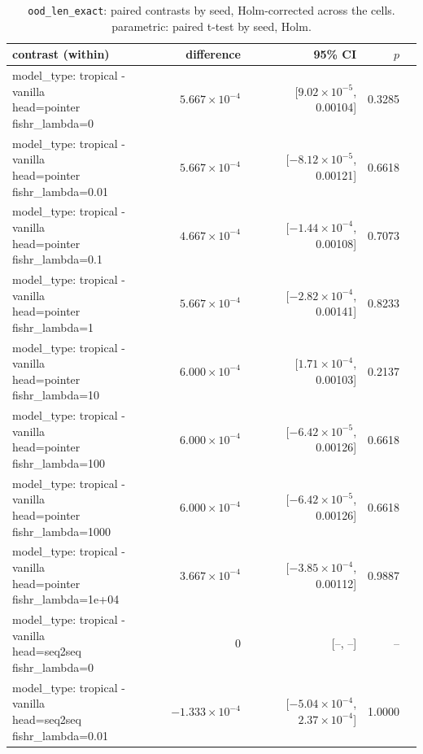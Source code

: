 \documentclass[10pt]{article}
\makeatletter
\newcommand{\stackcell}[1]{\begin{tabular}[t]{@{}l@{}}#1\end{tabular}}
\makeatother
\begin{document}
{\small
\begin{longtable}{lrrrl}
\caption{\texttt{ood\_len\_exact}: paired contrasts by seed, Holm-corrected across the cells. parametric: paired t-test by seed, Holm.}\label{tab:paired-ood_len_exact}\\
\toprule
contrast (within) & difference & 95\% CI & $p$ & \\
\midrule
\endhead
\stackcell{model\_type: tropical - vanilla\\\footnotesize head=pointer fishr\_lambda=0 } & $5.667\times10^{-4}$ & [$9.02\times10^{-5}$, 0.00104] & 0.3285 & \\
\stackcell{model\_type: tropical - vanilla\\\footnotesize head=pointer fishr\_lambda=0.01 } & $5.667\times10^{-4}$ & [$-8.12\times10^{-5}$, 0.00121] & 0.6618 & \\
\stackcell{model\_type: tropical - vanilla\\\footnotesize head=pointer fishr\_lambda=0.1 } & $4.667\times10^{-4}$ & [$-1.44\times10^{-4}$, 0.00108] & 0.7073 & \\
\stackcell{model\_type: tropical - vanilla\\\footnotesize head=pointer fishr\_lambda=1 } & $5.667\times10^{-4}$ & [$-2.82\times10^{-4}$, 0.00141] & 0.8233 & \\
\stackcell{model\_type: tropical - vanilla\\\footnotesize head=pointer fishr\_lambda=10 } & $6.000\times10^{-4}$ & [$1.71\times10^{-4}$, 0.00103] & 0.2137 & \\
\stackcell{model\_type: tropical - vanilla\\\footnotesize head=pointer fishr\_lambda=100 } & $6.000\times10^{-4}$ & [$-6.42\times10^{-5}$, 0.00126] & 0.6618 & \\
\stackcell{model\_type: tropical - vanilla\\\footnotesize head=pointer fishr\_lambda=1000 } & $6.000\times10^{-4}$ & [$-6.42\times10^{-5}$, 0.00126] & 0.6618 & \\
\stackcell{model\_type: tropical - vanilla\\\footnotesize head=pointer fishr\_lambda=1e+04 } & $3.667\times10^{-4}$ & [$-3.85\times10^{-4}$, 0.00112] & 0.9887 & \\
\stackcell{model\_type: tropical - vanilla\\\footnotesize head=seq2seq fishr\_lambda=0 } & 0 & [--, --] & -- & \\
\stackcell{model\_type: tropical - vanilla\\\footnotesize head=seq2seq fishr\_lambda=0.01 } & $-1.333\times10^{-4}$ & [$-5.04\times10^{-4}$, $2.37\times10^{-4}$] & 1.0000 & \\

\end{longtable}}
\end{document}
